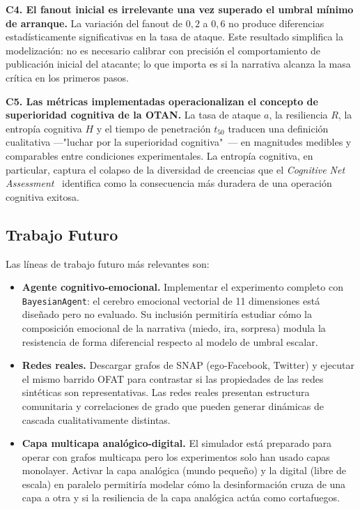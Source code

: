 \documentclass[12pt]{extarticle}
\numberwithin{equation}{section}
\begin{document}
\begin{refsection}
\textbf{C4. El fanout inicial es irrelevante una vez superado el umbral mínimo de arranque.} La variación del fanout de $0{,}2$ a $0{,}6$ no produce diferencias estadísticamente significativas en la tasa de ataque. Este resultado simplifica la modelización: no es necesario calibrar con precisión el comportamiento de publicación inicial del atacante; lo que importa es si la narrativa alcanza la masa crítica en los primeros pasos.

\textbf{C5. Las métricas implementadas operacionalizan el concepto de superioridad cognitiva de la OTAN.} La tasa de ataque $a$, la resiliencia $R$, la entropía cognitiva $H$ y el tiempo de penetración $t_{50}$ traducen una definición cualitativa ---"luchar por la superioridad cognitiva"~\cite{NATOChiefScientist2025}--- en magnitudes medibles y comparables entre condiciones experimentales. La entropía cognitiva, en particular, captura el colapso de la diversidad de creencias que el \emph{Cognitive Net Assessment}~\cite{PolytechniqueCNA2026} identifica como la consecuencia más duradera de una operación cognitiva exitosa.

\subsection{Trabajo Futuro}

Las líneas de trabajo futuro más relevantes son:

\begin{itemize}
    \item \textbf{Agente cognitivo-emocional.} Implementar el experimento completo con \texttt{BayesianAgent}: el cerebro emocional vectorial de 11 dimensiones está diseñado pero no evaluado. Su inclusión permitiría estudiar cómo la composición emocional de la narrativa (miedo, ira, sorpresa) modula la resistencia de forma diferencial respecto al modelo de umbral escalar.

    \item \textbf{Redes reales.} Descargar grafos de SNAP (ego-Facebook, Twitter) y ejecutar el mismo barrido OFAT para contrastar si las propiedades de las redes sintéticas son representativas. Las redes reales presentan estructura comunitaria y correlaciones de grado que pueden generar dinámicas de cascada cualitativamente distintas.

    \item \textbf{Capa multicapa analógico-digital.} El simulador está preparado para operar con grafos multicapa pero los experimentos solo han usado capas monolayer. Activar la capa analógica (mundo pequeño) y la digital (libre de escala) en paralelo permitiría modelar cómo la desinformación cruza de una capa a otra y si la resiliencia de la capa analógica actúa como cortafuegos.


\end{itemize}
\end{refsection}
\end{document}
